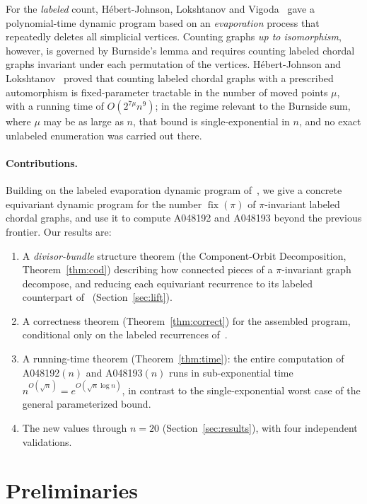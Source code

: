 \documentclass[11pt]{article}
\theoremstyle{plain}
\theoremstyle{definition}
\DeclareMathOperator{\fix}{fix}
\begin{document}
For the \emph{labeled} count, H\'ebert-Johnson, Lokshtanov and Vigoda~\cite{HLV2023} gave a
polynomial-time dynamic program based on an \emph{evaporation} process that repeatedly deletes all
simplicial vertices. Counting graphs \emph{up to isomorphism}, however, is governed by Burnside's
lemma and requires counting labeled chordal graphs invariant under each permutation of the vertices.
H\'ebert-Johnson and Lokshtanov~\cite{HLV2025} proved that counting labeled chordal graphs with a
prescribed automorphism is fixed-parameter tractable in the number of moved points $\mu$, with a
running time of $O(2^{7\mu}n^{9})$; in the regime relevant to the Burnside sum, where $\mu$ may be
as large as $n$, that bound is single-exponential in $n$, and no exact unlabeled enumeration was
carried out there.

\paragraph{Contributions.} Building on the labeled evaporation dynamic program of~\cite{HLV2023},
we give a concrete equivariant dynamic program for the number $\fix(\pi)$ of $\pi$-invariant labeled
chordal graphs, and use it to compute A048192 and A048193 beyond the previous frontier. Our results
are:
\begin{enumerate}[topsep=2pt,itemsep=1pt]
\item A \emph{divisor-bundle} structure theorem (the Component-Orbit Decomposition,
Theorem~\ref{thm:cod}) describing how connected pieces of a $\pi$-invariant graph decompose, and
reducing each equivariant recurrence to its labeled counterpart of~\cite{HLV2023}
(Section~\ref{sec:lift}).
\item A correctness theorem (Theorem~\ref{thm:correct}) for the assembled program, conditional only
on the labeled recurrences of~\cite{HLV2023}.
\item A running-time theorem (Theorem~\ref{thm:time}): the entire computation of A048192$(n)$ and
A048193$(n)$ runs in sub-exponential time $n^{O(\sqrt n)}=e^{O(\sqrt n\log n)}$, in contrast to the
single-exponential worst case of the general parameterized bound.
\item The new values through $n=20$ (Section~\ref{sec:results}), with four independent validations.
\end{enumerate}

\section{Preliminaries}
\end{document}
